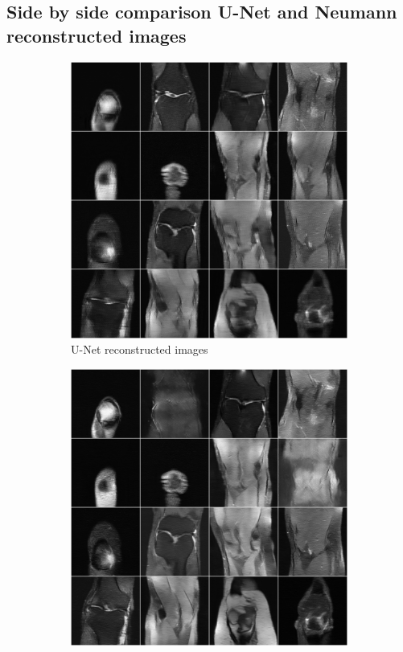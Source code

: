 \documentclass{article}
\begin{document}
 
\subsection{Side by side comparison U-Net and Neumann reconstructed images}
\begin{figure}[H] 
\centering
   \begin{subfigure}[]{.5\textwidth}
   \centering
        \includegraphics[width=.95\linewidth]{Unet_reconstruction}
	\caption{U-Net  reconstructed images}
	\vspace*{2mm} 
    \end{subfigure}%
   \begin{subfigure}[]{.5\textwidth}
   \centering
        \includegraphics[width=.95\linewidth]{neumann_reconstruction}

\end{subfigure}
\end{figure}
\end{document}
